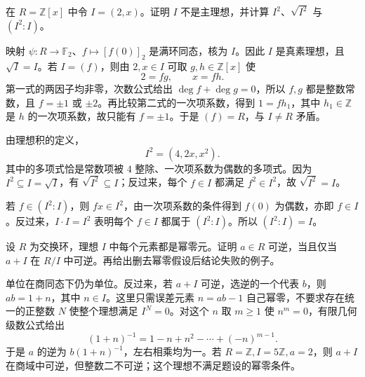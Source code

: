 \begin{exercise}\label{b1:ex:10-nonprincipal-ideal}
	在 \(R=\mathbb Z[x]\) 中令 \(I=(2,x)\)。证明 \(I\) 不是主理想，并计算 \(I^2\)、\(\sqrt{I^2}\) 与 \((I^2:I)\)。
\end{exercise}
\begin{solution}
	映射 \(\psi:R\to\mathbb F_2\)、\(f\mapsto[f(0)]_2\) 是满环同态，核为 \(I\)。因此 \(I\) 是真素理想，且 \(\sqrt I=I\)。若 \(I=(f)\)，则由 \(2,x\in I\) 可取 \(g,h\in\mathbb Z[x]\) 使
	\[
		2=fg,\qquad x=fh.
	\]
	第一式的两因子均非零，次数公式给出 \(\deg f+\deg g=0\)，所以 \(f,g\) 都是整数常数，且 \(f=\pm1\) 或 \(\pm2\)。再比较第二式的一次项系数，得到 \(1=f h_1\)，其中 \(h_1\in\mathbb Z\) 是 \(h\) 的一次项系数，故只能有 \(f=\pm1\)。于是 \((f)=R\)，与 \(I\ne R\) 矛盾。

	由理想积的定义，
	\[
		I^2=(4,2x,x^2).
	\]
	其中的多项式恰是常数项被 \(4\) 整除、一次项系数为偶数的多项式。因为 \(I^2\subseteq I=\sqrt I\)，有 \(\sqrt{I^2}\subseteq I\)；反过来，每个 \(f\in I\) 都满足 \(f^2\in I^2\)，故 \(\sqrt{I^2}=I\)。

	若 \(f\in(I^2:I)\)，则 \(fx\in I^2\)，由一次项系数的条件得到 \(f(0)\) 为偶数，亦即 \(f\in I\)。反过来，\(I\cdot I=I^2\) 表明每个 \(f\in I\) 都属于 \((I^2:I)\)。所以 \((I^2:I)=I\)。
\end{solution}

\begin{exercise}\label{b1:ex:10-units-lift-nil}
	设 \(R\) 为交换环，理想 \(I\) 中每个元素都是幂零元。证明 \(a\in R\) 可逆，当且仅当 \(a+I\) 在 \(R/I\) 中可逆。再给出删去幂零假设后结论失败的例子。
\end{exercise}
\begin{solution}
	单位在商同态下仍为单位。反过来，若 \(a+I\) 可逆，选逆的一个代表 \(b\)，则 \(ab=1+n\)，其中 \(n\in I\)。这里只需误差元素 \(n=ab-1\) 自己幂零，不要求存在统一的正整数 \(N\) 使整个理想满足 \(I^N=0\)。对这个 \(n\) 取 \(m\geq1\) 使 \(n^m=0\)，有限几何级数公式给出
	\[
		(1+n)^{-1}=1-n+n^2-\cdots+(-n)^{m-1}.
	\]
	于是 \(a\) 的逆为 \(b(1+n)^{-1}\)，左右相乘均为一。若 \(R=\mathbb Z,I=5\mathbb Z,a=2\)，则 \(a+I\) 在商域中可逆，但整数二不可逆；这个理想不满足题设的幂零条件。
\end{solution}

